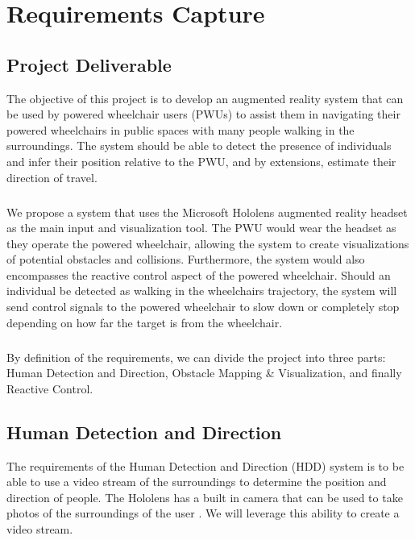 \chapter{Requirements Capture}

\section{Project Deliverable}
The objective of this project is to develop an augmented reality system that can be used by powered wheelchair users (PWUs) to assist them in navigating their powered wheelchairs in public spaces with many people walking in the surroundings. The system should be able to detect the presence of individuals and infer their position relative to the PWU, and by extensions, estimate their direction of travel.

\paragraph{}We propose a system that uses the Microsoft Hololens augmented reality headset as the main input and visualization tool. The PWU would wear the headset as they operate the powered wheelchair, allowing the system to create visualizations of potential obstacles and collisions. Furthermore, the system would also encompasses the reactive control aspect of the powered wheelchair. Should an individual be detected as walking in the wheelchairs trajectory, the system will send control signals to the powered wheelchair to slow down or completely stop depending on how far the target is from the wheelchair.

\paragraph{} By definition of the requirements, we can divide the project into three parts: Human Detection and Direction, Obstacle Mapping \& Visualization, and finally Reactive Control.

\section{Human Detection and Direction}
The requirements of the Human Detection and Direction (HDD) system is to be able to use a video stream of the surroundings to determine the position and direction of people. The Hololens has a built in camera that can be used to take photos of the surroundings of the user \cite{Chacon-Quesada}. We will leverage this ability to create a video stream.

